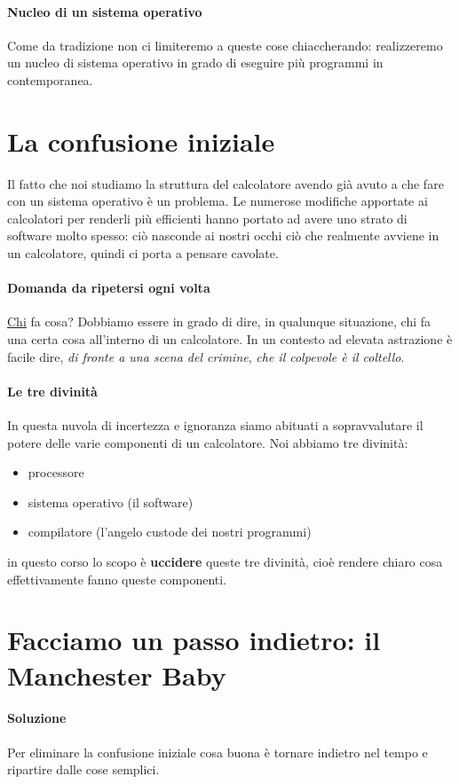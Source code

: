 \documentclass[11pt]{report}
\theoremstyle{definition}
\begin{document}
\paragraph{Nucleo di un sistema operativo} Come da tradizione non ci limiteremo a queste cose chiaccherando: realizzeremo un nucleo di sistema operativo in grado di eseguire più programmi in contemporanea.

\section{La confusione iniziale} 
Il fatto che noi studiamo la struttura del calcolatore avendo già avuto a che fare con un sistema operativo è un problema. Le numerose modifiche apportate ai calcolatori per renderli più efficienti hanno portato ad avere uno strato di software molto spesso: ciò nasconde ai nostri occhi ciò che realmente avviene in un calcolatore, quindi ci porta a pensare cavolate.
\paragraph{Domanda da ripetersi ogni volta} \underline{\underline{Chi}} fa cosa? Dobbiamo essere in grado di dire, in qualunque situazione, chi fa una certa cosa all'interno di un calcolatore. In un contesto ad elevata astrazione è facile dire, \emph{di fronte a una scena del crimine}, \emph{che il colpevole è il coltello}.
\paragraph{Le tre divinità} In questa nuvola di incertezza e ignoranza siamo abituati a sopravvalutare il potere delle varie componenti di un calcolatore. Noi abbiamo tre divinità:
\begin{itemize}
\item processore
\item sistema operativo (il software)
\item compilatore (l'angelo custode dei nostri programmi)
\end{itemize}
in questo corso lo scopo è \textbf{uccidere} queste tre divinità, cioè rendere chiaro cosa effettivamente fanno queste componenti.

\section{Facciamo un passo indietro: il Manchester Baby}
\paragraph{Soluzione} Per eliminare la confusione iniziale cosa buona è tornare indietro nel tempo e ripartire dalle cose semplici.
\end{document}
